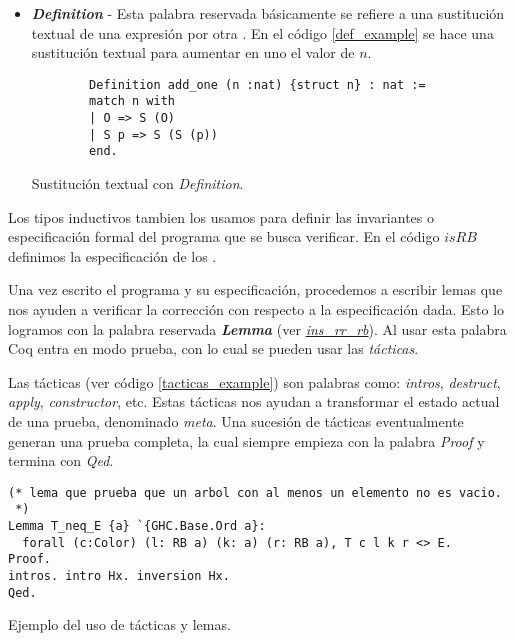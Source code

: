\begin{itemize}
  \item \textbf{\textit{Definition}} - Esta palabra reservada b\'asicamente se refiere a una sustituci\'on textual de 
    una expresión por otra \cite{coqdefs}. En el c\'odigo \ref{def_example} se hace una sustituci\'on textual para aumentar en uno el valor de $n$.
    \begin{listing}[!ht]
      \centering
      \captionsetup{justification=centering}
      \begin{verbatim}
        Definition add_one (n :nat) {struct n} : nat :=
        match n with
        | O => S (O)
        | S p => S (S (p))
        end. 
      \end{verbatim}
      \caption{Sustituci\'on textual con \textit{Definition}.}
      \label{def_example}
      \end{listing}
\end{itemize}


Los tipos inductivos tambien los usamos para definir las invariantes o especificación formal del programa 
que se busca verificar. En el c\'odigo \hyperref[inductive_isRB]{$isRB$} definimos la especificación 
de los {\arns}.

Una vez escrito el programa y su especificación, procedemos a escribir lemas que nos ayuden a verificar
la correcci\'on con respecto a la especificación dada. Esto lo logramos con la palabra reservada 
\textbf{\textit{Lemma}} (ver \hyperref[lema_1]{\textit{ins\_rr\_rb}}). Al usar esta palabra Coq entra en modo 
prueba, con lo cual se pueden usar las \textit{t\'acticas}.

Las t\'acticas\cite{TACTICS} (ver c\'odigo \ref{tacticas_example}) son palabras como: \textit{intros}, \textit{destruct}, \textit{apply}, \textit{constructor}, etc. Estas 
t\'acticas nos ayudan a transformar el estado actual de una prueba, denominado \textit{meta}. Una
sucesión de t\'acticas eventualmente generan una prueba completa, la cual siempre empieza con la palabra
\textit{Proof} y termina con \textit{Qed}.

\begin{listing}[!ht]
\centering
\captionsetup{justification=centering}
\begin{verbatim}
(* lema que prueba que un arbol con al menos un elemento no es vacio.
 *)
Lemma T_neq_E {a} `{GHC.Base.Ord a}:
  forall (c:Color) (l: RB a) (k: a) (r: RB a), T c l k r <> E.
Proof.
intros. intro Hx. inversion Hx.
Qed.
\end{verbatim}
\caption{Ejemplo del uso de t\'acticas y lemas.}
\label{tacticas_example}
\end{listing}

